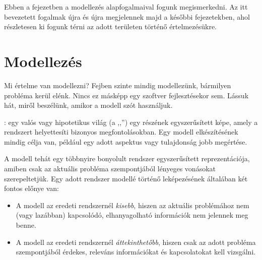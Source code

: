 
Ebben a fejezetben a modellezés alapfogalmaival fogunk megismerkedni. Az itt bevezetett fogalmak újra és újra megjelennek majd a későbbi fejezetekben, ahol részletesen ki fogunk térni az adott területen történő értelmezésükre.


\section{Modellezés}

Mi értelme van modellezni? Fejben szinte mindig modellezünk, bármilyen probléma kerül elénk. Nincs ez másképp egy szoftver fejlesztésekor sem. Lássuk hát, miről beszélünk, amikor a modell szót használjuk.

\begin{definicio}
	: egy valós vagy hipotetikus világ (a ,,'') egy részének egyszerűsített képe, amely a rendszert helyettesíti bizonyos megfontolásokban. Egy modell elkészítésének mindig célja van, például egy adott aspektus vagy tulajdonság jobb megértése.
\end{definicio}

A modell tehát egy többnyire bonyolult rendszer egyszerűsített reprezentációja, amiben csak az aktuális probléma szempontjából lényeges vonásokat szerepeltetjük.
Egy adott rendszer modellé történő leképezésének általában két fontos előnye van: %

\begin{itemize}
	\item A modell az eredeti rendszernél \emph{kisebb}, hiszen az aktuális problémához nem (vagy lazábban) kapcsolódó, elhanyagolható információk nem jelennek meg benne.
	\item A modell az eredeti rendszernél \emph{áttekinthetőbb}, hiszen csak az adott probléma szempontjából érdekes, releváns információkat és kapcsolatokat kell vizsgálni.
\end{itemize}

